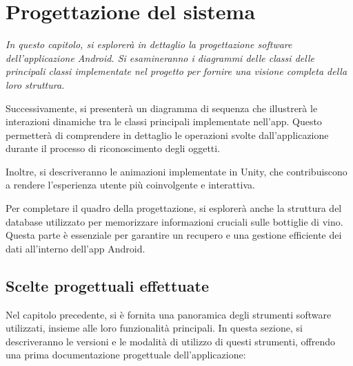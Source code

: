 \chapter{Progettazione del sistema}

\begin{preamble}
{\em 
In questo capitolo, si esplorerà in dettaglio la progettazione software dell'applicazione Android. Si esamineranno i diagrammi delle classi delle principali classi implementate nel progetto per fornire una visione completa della loro struttura.

Successivamente, si presenterà un diagramma di sequenza che illustrerà le interazioni dinamiche tra le classi principali implementate nell'app. Questo permetterà di comprendere in dettaglio le operazioni svolte dall'applicazione durante il processo di riconoscimento degli oggetti.

Inoltre, si descriveranno le animazioni implementate in Unity, che contribuiscono a rendere l'esperienza utente più coinvolgente e interattiva.

Per completare il quadro della progettazione, si esplorerà anche la struttura del database utilizzato per memorizzare informazioni cruciali sulle bottiglie di vino. Questa parte è essenziale per garantire un recupero e una gestione efficiente dei dati all'interno dell'app Android.
}
\end{preamble}

\section{Scelte progettuali effettuate}

Nel capitolo precedente, si è fornita una panoramica degli strumenti software utilizzati, insieme alle loro funzionalità principali. In questa sezione, si descriveranno le versioni e le modalità di utilizzo di questi strumenti, offrendo una prima documentazione progettuale dell'applicazione:

